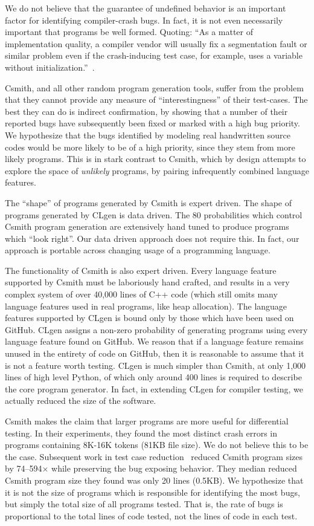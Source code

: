 We do not believe that the guarantee of undefined behavior is an important factor for identifying compiler-crash bugs. In fact, it is not even necessarily important that programs be well formed. Quoting: ``As a matter of implementation quality, a compiler vendor will usually fix a segmentation fault or similar problem even if the crash-inducing test case, for example, uses a variable without initialization.''~\cite{Regehr2012a}.

Csmith, and all other random program generation tools, suffer from the problem that they cannot provide any measure of ``interestingness'' of their test-cases. The best they can do is indirect confirmation, by showing that a number of their reported bugs have subsequently been fixed or marked with a high bug priority. We hypothesize that the bugs identified by modeling real handwritten source codes would be more likely to be of a high priority, since they stem from more likely programs. This is in stark contrast to Csmith, which by design attempts to explore the space of \emph{unlikely} programs, by pairing infrequently combined language features.

The ``shape'' of programs generated by Csmith is expert driven. The shape of programs generated by CLgen is data driven. The 80 probabilities which control Csmith program generation are extensively hand tuned to produce programs which ``look right''. Our data driven approach does not require this. In fact, our approach is portable across changing usage of a programming language.

The functionality of Csmith is also expert driven. Every language feature supported by Csmith must be laboriously hand crafted, and results in a very complex system of over 40,000 lines of C++ code (which still omits many language features used in real programs, like heap allocation). The language features supported by CLgen is bound only by those which have been used on GitHub. CLgen assigns a non-zero probability of generating programs using every language feature found on GitHub. We reason that if a language feature remains unused in the entirety of code on GitHub, then it is reasonable to assume that it is not a feature worth testing. CLgen is much simpler than Csmith, at only 1,000 lines of high level Python, of which only around 400 lines is required to describe the core program generator. In fact, in extending CLgen for compiler testing, we actually reduced the size of the software.

Csmith makes the claim that larger programs are more useful for differential testing. In their experiments, they found the most distinct crash errors in programs containing 8K-16K tokens (81KB file size). We do not believe this to be the case. Subsequent work in test case reduction~\cite{Regehr2012a} reduced Csmith program sizes by 74--594$\times$ while preserving the bug exposing behavior. They median reduced Csmith program size they found was only 20 lines (0.5KB). We hypothesize that it is not the size of programs which is responsible for identifying the most bugs, but simply the total size of all programs tested. That is, the rate of bugs is proportional to the total lines of code tested, not the lines of code in each test.


